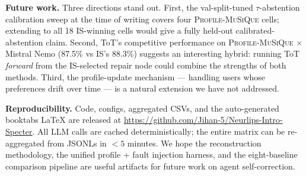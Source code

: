 \textbf{Future work.} Three directions stand out. First, the
val-split-tuned $\tau$-abstention calibration sweep at the time
of writing covers four \textsc{Profile-MuSiQue} cells; extending
to all 18 IS-winning cells would give a fully held-out
calibrated-abstention claim. Second, ToT's competitive
performance on \textsc{Profile-MuSiQue} $\times$ Mistral Nemo
(87.5\% vs IS's 88.3\%) suggests an interesting hybrid:
running ToT \emph{forward} from the IS-selected repair node could
combine the strengths of both methods. Third, the
profile-update mechanism --- handling users whose preferences
drift over time --- is a natural extension we have not
addressed.

\textbf{Reproducibility.} Code, configs, aggregated CSVs, and
the auto-generated booktabs LaTeX are released at
\url{https://github.com/Jihan-5/Neurlips-Intro-Specter}. All
LLM calls are cached deterministically; the entire matrix can
be re-aggregated from JSONLs in $<5$ minutes. We hope the
reconstruction methodology, the unified profile + fault
injection harness, and the eight-baseline comparison pipeline
are useful artifacts for future work on agent self-correction.
